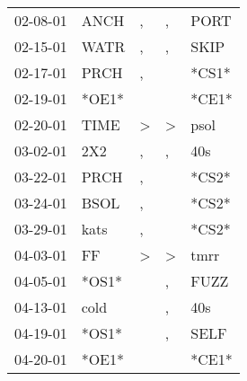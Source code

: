 \begin{supertabular}{p{0.07\textwidth}p{0.06\textwidth}p{0.02\textwidth}p{0.02\textwidth}p{0.06\textwidth}}
          02-08-01\textsuperscript{} &           ANCH\textsuperscript{} &                , &                , &           PORT\textsuperscript{} \\
          02-15-01\textsuperscript{} &           WATR\textsuperscript{} &                , &                , &           SKIP\textsuperscript{} \\
          02-17-01\textsuperscript{} &           PRCH\textsuperscript{} &                , &                  &                            *CS1* \\
          02-19-01\textsuperscript{} &                            *OE1* &                  &                  &                            *CE1* \\
          02-20-01\textsuperscript{} &           TIME\textsuperscript{} &     \textgreater &     \textgreater &           psol\textsuperscript{} \\
          03-02-01\textsuperscript{} &            2X2\textsuperscript{} &                , &                , &            40s\textsuperscript{} \\
          03-22-01\textsuperscript{} &           PRCH\textsuperscript{} &                , &                  &                            *CS2* \\
          03-24-01\textsuperscript{} &           BSOL\textsuperscript{} &                , &                  &                            *CS2* \\
          03-29-01\textsuperscript{} &           kats\textsuperscript{} &                , &                  &                            *CS2* \\
          04-03-01\textsuperscript{} &             FF\textsuperscript{} &     \textgreater &     \textgreater &           tmrr\textsuperscript{} \\
          04-05-01\textsuperscript{} &                            *OS1* &                  &                , &           FUZZ\textsuperscript{} \\
          04-13-01\textsuperscript{} &           cold\textsuperscript{} &                  &                , &            40s\textsuperscript{} \\
          04-19-01\textsuperscript{} &                            *OS1* &                  &                , &           SELF\textsuperscript{} \\
          04-20-01\textsuperscript{} &                            *OE1* &                  &                  &                            *CE1* \\

\end{supertabular}
